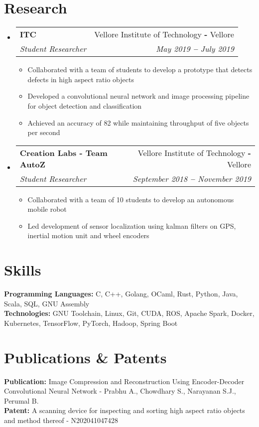 \documentclass[12pt]{article}
\makeatletter
\newcommand{\resumeItem}[1]{
  \item\small{
    {#1}
  } 
  \vspace{-3pt}
}
\newcommand{\resumeSubheading}[4]{
  \item
    \begin{tabular*}{0.97\textwidth}[t]{l@{\extracolsep{\fill}}r}
      \textbf{\small#1} & \small#2 \\
      \textit{\small#3} & \textit{\small #4} \\
    \end{tabular*}
}
\newcommand{\resumeSubHeadingListStart}{\begin{itemize}[leftmargin=0.15in, label={}]}
\newcommand{\resumeSubHeadingListEnd}{\end{itemize}}
\newcommand{\resumeItemListStart}{\begin{itemize}\vspace{-8pt}}
\newcommand{\resumeItemListEnd}{\end{itemize}\vspace{-8pt}}
\makeatother
\begin{document}
\section{Research}
  \resumeSubHeadingListStart
    \resumeSubheading
      {ITC}{ Vellore Institute of Technology  \textbf{-} Vellore}
      {Student Researcher}{May 2019 \textbf{--}  July 2019}
        \resumeItemListStart
            \resumeItem{Collaborated with a team of students to develop a prototype that detects defects in high aspect ratio objects}
            \resumeItem{Developed a convolutional neural network and image processing pipeline for object detection and classification}
            \resumeItem{Achieved an accuracy of 82\symbol{\%} while maintaining throughput of five objects per second}
            \resumeItemListEnd
    \resumeSubheading
      {Creation Labs - Team AutoZ}{Vellore Institute of Technology \textbf{-} Vellore}
      {Student Researcher}{September 2018 \textbf{--}  November 2019}
        \resumeItemListStart
            \resumeItem{Collaborated with a team of 10 students to develop an autonomous mobile robot}
            \resumeItem{Led development of sensor localization using kalman filters on GPS, inertial motion unit and wheel encoders}
            \resumeItemListEnd
  \resumeSubHeadingListEnd
    \vspace{0pt}


\section{Skills}
  \resumeSubHeadingListStart
    \small{\item{
        \textbf{Programming Languages: }{C, C++, Golang, OCaml, Rust, Python, Java, Scala, SQL, GNU Assembly} \\
        \textbf{Technologies: }{GNU Toolchain, Linux, Git, CUDA, ROS, Apache Spark, Docker, Kubernetes, TensorFlow, PyTorch, Hadoop, Spring Boot} \\
      }}
  \resumeSubHeadingListEnd


  \section{Publications \& Patents}
  \resumeSubHeadingListStart
    \small{\item{
        \textbf{Publication:}{ Image Compression and Reconstruction Using Encoder-Decoder Convolutional Neural Network - Prabhu A., Chowdhary S., Narayanan S.J., Perumal B.} \\ 
        \textbf{Patent:}{ A scanning device for inspecting and sorting high aspect ratio objects and method thereof - N202041047428} 
      }}
  \resumeSubHeadingListEnd
\end{document}
